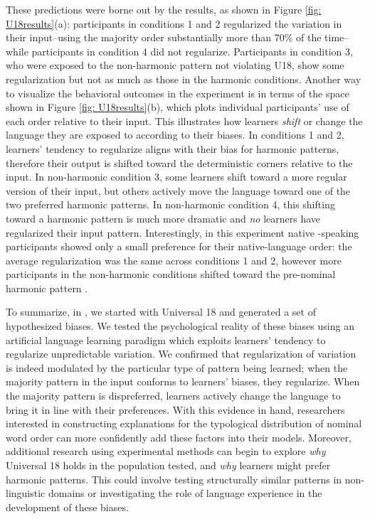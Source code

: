 \documentclass[output=paper]{langsci/langscibook}
\begin{document}
These predictions were borne out by the results, as shown in Figure \ref{fig: U18results}(a): participants in conditions 1 and 2 regularized the variation in their input--using the majority order substantially more than 70\% of the time--while participants in condition 4 did not regularize. Participants in condition 3, who were exposed to the non-harmonic pattern not violating U18, show some regularization but not as much as those in the harmonic conditions. Another way to visualize the behavioral outcomes in the experiment is in terms of the space shown in Figure \ref{fig: U18results}(b), which plots individual participants' use of each order relative to their input. This illustrates how learners \textit{shift} or change the language they are exposed to according to their biases. In conditions 1 and 2, learners' tendency to regularize aligns with their bias for harmonic patterns, therefore their output is shifted toward the deterministic corners relative to the input. In  non-harmonic condition 3, some learners shift toward a more regular version of their input, but others actively move the language toward one of the two preferred harmonic patterns. In non-harmonic condition 4, this shifting toward a harmonic pattern is much more dramatic and \textit{no} learners have regularized  their input pattern. Interestingly, in this experiment native -speaking  participants showed only a small preference for their native-language order: the average regularization was the same across conditions 1 and 2, however more participants in the non-harmonic conditions shifted toward the pre-nominal harmonic pattern \citep[for additional discussion about prior language experience and an alternative explanation of this difference see][]{CulbertsonSmolenskyLegendre12, culbertson2015harmonic}.

To summarize, in \cite{CulbertsonSmolenskyLegendre12}, we started with Universal 18 and generated a set of hypothesized biases. We tested the psychological reality of these biases  using an  artificial language learning paradigm which exploits learners' tendency to regularize unpredictable variation. We confirmed that regularization of variation is indeed modulated by the particular type of pattern being learned; when the majority pattern in the input conforms to learners' biases,   they regularize. When the majority pattern is dispreferred, learners actively change the language to bring it in line with their preferences. With this evidence in hand, researchers interested in constructing explanations for the typological distribution of nominal word order can more confidently add these factors into their models. Moreover, additional research using experimental methods can begin to explore \textit{why} Universal 18 holds in the population tested, and \textit{why} learners might prefer harmonic patterns. This could involve testing structurally similar patterns in non-linguistic domains or investigating the role of language experience in the development of these biases.
\end{document}
